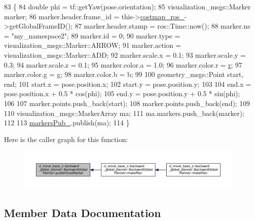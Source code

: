 \begin{DoxyCode}
83 \{
84     \textcolor{keywordtype}{double} phi = tf::getYaw(pose.orientation);
85     visualization\_msgs::Marker marker;
86     marker.header.frame\_id = this->\hyperlink{classcl__move__base__z_1_1backward__global__planner_1_1BackwardGlobalPlanner_a7103c15e6540a514acd421c3c6e194a4}{costmap\_ros\_}->getGlobalFrameID();
87     marker.header.stamp = ros::Time::now();
88     marker.ns = \textcolor{stringliteral}{"my\_namespace2"};
89     marker.id = 0;
90     marker.type = visualization\_msgs::Marker::ARROW;
91     marker.action = visualization\_msgs::Marker::ADD;
92     marker.scale.x = 0.1;
93     marker.scale.y = 0.3;
94     marker.scale.z = 0.1;
95     marker.color.a = 1.0;
96     marker.color.r = \hyperlink{namespacefake__cube__perception__node_a36e88703ab69fd35065e8a8d9344903e}{r};
97     marker.color.g = g;
98     marker.color.b = b;
99 
100     geometry\_msgs::Point start, end;
101     start.x = pose.position.x;
102     start.y = pose.position.y;
103 
104     end.x = pose.position.x + 0.5 * cos(phi);
105     end.y = pose.position.y + 0.5 * sin(phi);
106 
107     marker.points.push\_back(start);
108     marker.points.push\_back(end);
109 
110     visualization\_msgs::MarkerArray ma;
111     ma.markers.push\_back(marker);
112 
113     \hyperlink{classcl__move__base__z_1_1backward__global__planner_1_1BackwardGlobalPlanner_a6f80f7041c8cdc93e1f3dfd0e723654a}{markersPub\_}.publish(ma);
114 \}
\end{DoxyCode}


Here is the caller graph for this function\+:
\nopagebreak
\begin{figure}[H]
\begin{center}
\leavevmode
\includegraphics[width=350pt]{classcl__move__base__z_1_1backward__global__planner_1_1BackwardGlobalPlanner_a3c6784cad10fdadf28323380fe3d6d2b_icgraph}
\end{center}
\end{figure}




\subsection{Member Data Documentation}

